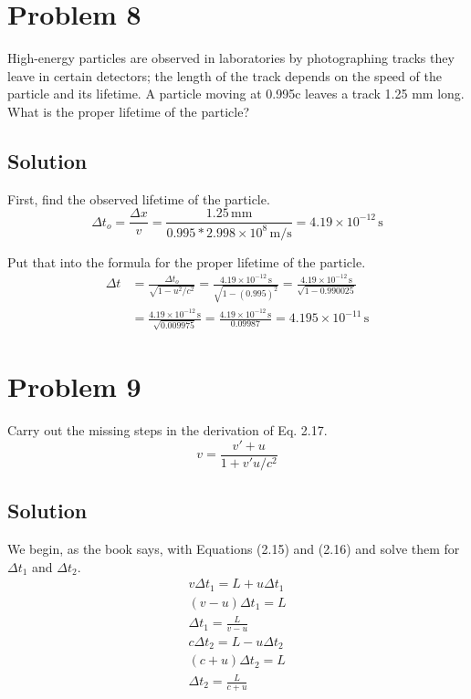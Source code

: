 \documentclass[12pt]{article}
\newcommand{\E}[1]{\times 10^{#1}}
\begin{document}
\section{Problem 8}
    High-energy particles are observed in laboratories by photographing tracks they leave in certain detectors; the length of the track depends on the speed of the particle and its lifetime. 
    A particle moving at 0.995c leaves a track 1.25 mm long. 
    What is the proper lifetime of the particle?

    \subsection{Solution}
        First, find the observed lifetime of the particle.
        \begin{equation}
            \Delta t_o = \frac{\Delta x}{v}
                =   \frac{1.25\,\unit{\milli\meter}}{0.995 * 2.998\E{8}\,\unit{\meter/\second}}
                =   4.19\E{-12}\,\unit{\second}
        \end{equation}

        Put that into the formula for the proper lifetime of the particle.
        \begin{align}
            \Delta t    &=  \frac{\Delta t_o}{\sqrt{1 - u^2/c^2}}
                =   \frac{4.19\E{-12}\,\unit{\second}}{\sqrt{1 - (0.995)^2}}
                =   \frac{4.19\E{-12}\,\unit{\second}}{\sqrt{1 - 0.990025}}\\
                &=  \frac{4.19\E{-12}\,\unit{\second}}{\sqrt{0.009975}}
                =   \frac{4.19\E{-12}\,\unit{\second}}{0.09987}
                =   \boxed{4.195\E{-11}\,\unit{\second}}
        \end{align}
    \pagebreak

\section{Problem 9}
    Carry out the missing steps in the derivation of Eq. 2.17.
    \begin{equation}
        \label{eq:2.17} \tag{2.17}
        v = \frac{v' + u}{1 + v'u/c^2}
    \end{equation}

    \subsection{Solution}
        We begin, as the book says, with Equations (2.15) and (2.16) and solve them for $\Delta t_1$ and $\Delta t_2$.
        \begin{gather}
            \tag{2.15}
            v \Delta t_1 = L + u\Delta t_1\\
            (v - u) \Delta t_1 = L\\
            \Delta t_1 = \frac{L}{v - u}\\
            \tag{2.16}
            c \Delta t_2 = L - u \Delta t_2\\
            (c + u) \Delta t_2 = L\\
            \Delta t_2 = \frac{L}{c + u}
        \end{gather}
\end{document}
